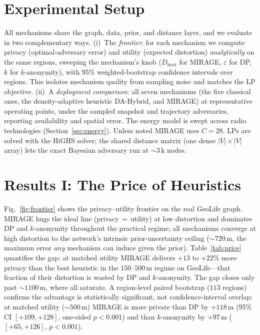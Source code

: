 \documentclass[10pt,journal,compsoc]{IEEEtran}
\begin{document}
\section{Experimental Setup}
\label{sec:setup}
All mechanisms share the graph, data, prior, and distance layer, and we evaluate
in two complementary ways. (i)~The \emph{frontier}: for each mechanism we compute
privacy (optimal-adversary error) and utility (expected distortion)
\emph{analytically} on the same regions, sweeping the mechanism's knob ($D_{\max}$
for MIRAGE, $\varepsilon$ for DP, $k$ for $k$-anonymity), with $95\%$
weighted-bootstrap confidence intervals over regions. This isolates mechanism
quality from sampling noise and matches the LP objective. (ii)~A \emph{deployment
comparison}: all seven mechanisms (the five classical ones, the density-adaptive
heuristic DA-Hybrid, and MIRAGE) at representative operating points, under the
sampled snapshot and trajectory adversaries, reporting availability and spatial
error. The energy model is swept across radio technologies
(Section~\ref{sec:energy}). Unless noted MIRAGE uses $C{=}28$. LPs are solved with
the HiGHS solver; the shared distance matrix (one dense $|V|\times|V|$ array) lets
the exact Bayesian adversary run at $\sim$3\,k nodes.

\section{Results I: The Price of Heuristics}
\label{sec:price}
Fig.~\ref{fig:frontier} shows the privacy--utility frontier on the real GeoLife
graph. MIRAGE hugs the ideal line (privacy$\,=\,$utility) at low distortion and
dominates DP and $k$-anonymity throughout the practical regime; all mechanisms
converge at high distortion to the network's intrinsic prior-uncertainty ceiling
($\sim$$720$\,m, the maximum error \emph{any} mechanism can induce given the
prior). Table~\ref{tab:price} quantifies the gap: at matched utility MIRAGE
delivers $+13$ to $+22\%$ more privacy than the best heuristic in the
$150$--$500$\,m regime on GeoLife---that fraction of their distortion is wasted by
DP and $k$-anonymity. The gap closes only past $\sim$$1100$\,m, where all saturate.
A region-level paired bootstrap ($113$ regions) confirms the advantage is
statistically significant, not confidence-interval overlap: at matched utility
($\sim$$500$\,m) MIRAGE is more private than DP by $+118$\,m (95\% CI
$[+109,+128]$, one-sided $p<0.001$) and than $k$-anonymity by $+97$\,m
($[+65,+126]$, $p<0.001$).
\end{document}
